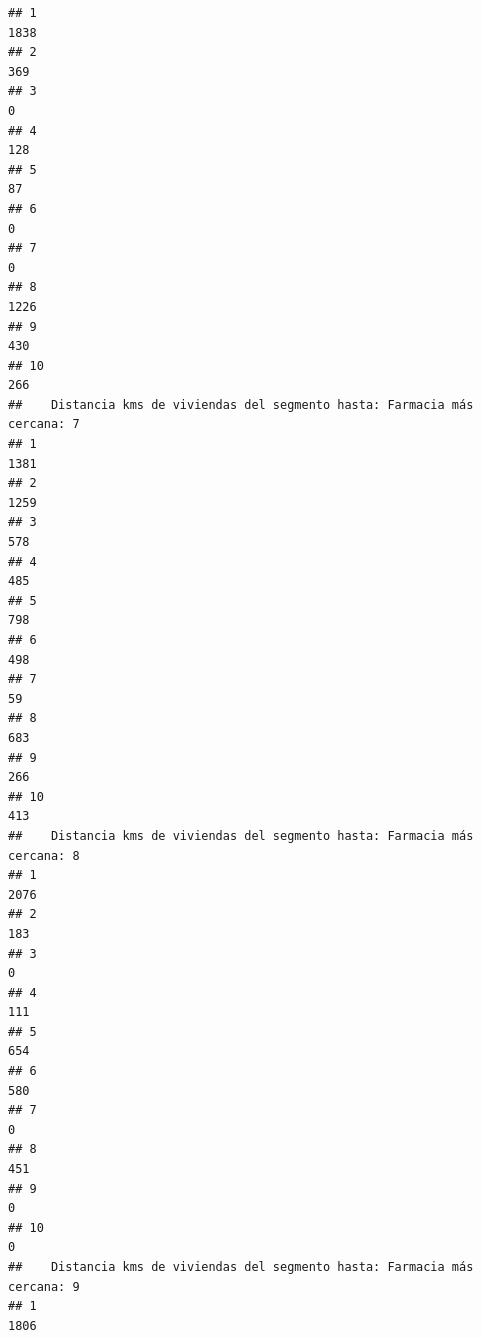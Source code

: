 \documentclass[11pt,]{article}
\begin{document}
\begin{verbatim}
## 1                                                                    1838
## 2                                                                     369
## 3                                                                       0
## 4                                                                     128
## 5                                                                      87
## 6                                                                       0
## 7                                                                       0
## 8                                                                    1226
## 9                                                                     430
## 10                                                                    266
##    Distancia kms de viviendas del segmento hasta: Farmacia más cercana: 7
## 1                                                                    1381
## 2                                                                    1259
## 3                                                                     578
## 4                                                                     485
## 5                                                                     798
## 6                                                                     498
## 7                                                                      59
## 8                                                                     683
## 9                                                                     266
## 10                                                                    413
##    Distancia kms de viviendas del segmento hasta: Farmacia más cercana: 8
## 1                                                                    2076
## 2                                                                     183
## 3                                                                       0
## 4                                                                     111
## 5                                                                     654
## 6                                                                     580
## 7                                                                       0
## 8                                                                     451
## 9                                                                       0
## 10                                                                      0
##    Distancia kms de viviendas del segmento hasta: Farmacia más cercana: 9
## 1                                                                    1806

\end{verbatim}
\end{document}
